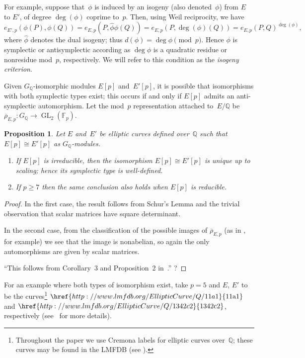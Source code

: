 \documentclass[12pt]{amsart}
\newcommand{\lmfdbec}[3]{\href{http://www.lmfdb.org/EllipticCurve/Q/#1#2#3}{{\text{\rm#1#2#3}}}}
\newcommand{\F}{\mathbb{F}}
\newcommand{\Q}{\mathbb{Q}}
\newcommand{\rhobar}{{\overline{\rho}}}
\newcommand{\GL}{\operatorname{GL}}
\numberwithin{equation}{section}
\newtheorem{proposition}[theorem]{Proposition}
\theoremstyle{definition}
\theoremstyle{remark}
\begin{document}
For example, suppose that~$\phi$ is induced by an isogeny (also
denoted~$\phi$) from $E$ to $E'$, of degree $\deg(\phi)$ coprime
to~$p$. Then, using Weil reciprocity, 
we have 
\[
  e_{E',p}(\phi(P), \phi(Q)) = e_{E,p}(P, \hat\phi\phi(Q)) =
  e_{E,p}(P, \deg(\phi)(Q)) = e_{E,p}(P, Q)^{\deg(\phi)},
  \]
  where $\hat{\phi}$ denotes the dual isogeny; 
  thus $d(\phi)=\deg\phi\pmod{p}$.
  Hence $\phi$ is symplectic or antisymplectic according as $\deg\phi$
is a quadratic residue or nonresidue mod~$p$, respectively.  We will refer to
this condition as the \emph{isogeny criterion}.

Given $G_\Q$-isomorphic modules $E[p]$ and~$E'[p]$, it is possible
that isomorphisms with both symplectic types exist; this occurs if and
only if $E[p]$ admits an anti-symplectic automorphism.  Let the
mod~$p$ representation attached to~$E/\Q$ be $\rhobar_{E,p} : G_\Q \to
\GL_2(\F_p)$.
\begin{proposition}\label{P:auto}
  Let $E$ and~$E'$ be elliptic curves defined over~$\Q$ such that
  $E[p]\cong E'[p]$ as $G_\Q$-modules.
  \begin{enumerate}
    \item If $E[p]$ is irreducible, then the isomorphism $E[p]\cong
      E'[p]$ is unique up to scaling; hence its symplectic type is
      well-defined.
      \item If $p\ge7$ then the same conclusion also holds when
        $E[p]$ is reducible.
  \end{enumerate}
\end{proposition}
\begin{proof}
In the first case, the result follows from Schur's Lemma and the
trivial observation that scalar matrices have square determinant.

In the second case, from the classification of the possible images of
$\rhobar_{E,p}$ (as in \cite{Sutherland}, for example) we see that the
image is nonabelian, so again the only automorphisms are given by
scalar matrices.

``This follows from Corollary~3 and Proposition~2 in~\cite{FKSym}.'' ? 
\end{proof}

For an example where both types of isomorphism exist, take $p=5$ and
$E$, $E'$ to be the curves\footnote{Throughout the paper we use
  Cremona labels for elliptic curves over~$\Q$; these curves may be
  found in the LMFDB (see \cite{lmfdb}).} $\lmfdbec{11}{a}{1}$ and
$\lmfdbec{1342}{c}{2}$, respectively (see~\cite[Example~5.2]{FKSym}
for more details).
\end{document}
